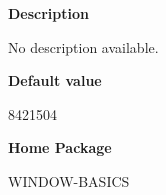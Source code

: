  
{\bf Description}

No description available.

 
{\bf Default value}

8421504

 
{\bf Home Package}

WINDOW-BASICS

